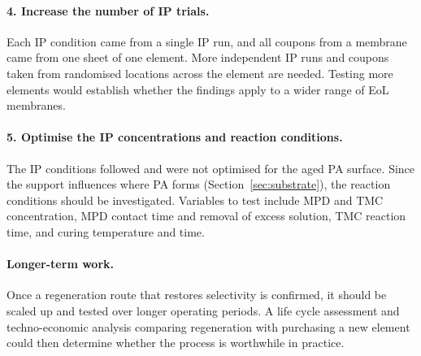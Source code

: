 \paragraph{4. Increase the number of IP trials.}
Each IP condition came from a single IP run, and all coupons from a membrane came from one sheet of one element. More independent IP runs and coupons taken from randomised locations across the element are needed. Testing more elements would establish whether the findings apply to a wider range of EoL membranes.

\paragraph{5. Optimise the IP concentrations and reaction conditions.}
The IP conditions followed \citet{Ogbe2026} and were not optimised for the aged PA surface. Since the support influences where PA forms (Section~\ref{sec:substrate}), the reaction conditions should be investigated. Variables to test include MPD and TMC concentration, MPD contact time and removal of excess solution, TMC reaction time, and curing temperature and time.

\paragraph{Longer-term work.}
Once a regeneration route that restores selectivity is confirmed, it should be scaled up and tested over longer operating periods. A life cycle assessment and techno-economic analysis comparing regeneration with purchasing a new element could then determine whether the process is worthwhile in practice.